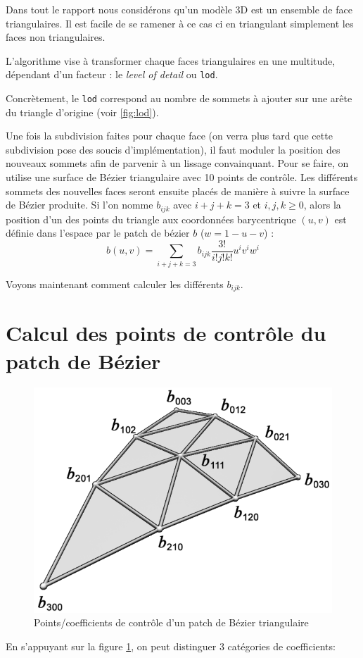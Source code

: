 \documentclass{article}
\begin{document}
Dans tout le rapport nous considérons qu'un modèle 3D est un ensemble de face
triangulaires. Il est facile de se ramener à ce cas ci en triangulant
simplement les faces non triangulaires.

L'algorithme vise à transformer chaque faces triangulaires en une multitude,
dépendant d'un facteur : le \textit{level of detail} ou \texttt{lod}.

Concrètement, le \texttt{lod} correspond au nombre de sommets à ajouter sur une
arête du triangle d'origine (voir \ref{fig:lod}).

Une fois la subdivision faites pour chaque face (on verra plus tard que cette
subdivision pose des soucis d'implémentation), il faut moduler la position des
nouveaux sommets afin de parvenir à un lissage convainquant. Pour se faire, on
utilise une surface de Bézier triangulaire avec 10 points de contrôle. Les
différents sommets des nouvelles faces seront ensuite placés de manière à
suivre la surface de Bézier produite. Si l'on nomme $b_{ijk}$ avec $i+j+k = 3$
et $i,j,k\geq 0$, alors la position d'un des points du triangle aux coordonnées
barycentrique $(u,v)$ est définie dans l'espace par le patch de bézier $b$
($w=1-u-v$) : $$b(u,v) = \sum_{i+j+k=3} b_{ijk} \frac{3!}{i!j!k!}u^i v^i w^i$$

Voyons maintenant comment calculer les différents $b_{ijk}$.

\section{Calcul des points de contrôle du patch de Bézier}

\begin{figure}[ht!]
\centering
    \includegraphics[width=0.4\linewidth]{control-points}
    \caption{Points/coefficients de contrôle d'un patch de Bézier triangulaire}
    \label{fig:control-points}
\end{figure}

En s'appuyant sur la figure \ref{fig:control-points}, on peut distinguer 3
catégories de coefficients:
\end{document}
